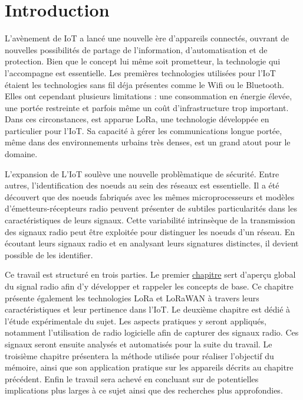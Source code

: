 

\chapter*{Introduction}

\renewcommand{\leftmark}{INTRODUCTION}

L'avènement de \ac{IoT} a lancé une nouvelle ère d'appareils connectés, ouvrant de nouvelles possibilités de partage de l'information, d'automatisation et de protection. Bien que le concept lui même soit prometteur, la technologie qui l'accompagne est essentielle.
Les premières technologies utilisées pour l'\ac{IoT} étaient les technologies sans fil déja présentes comme le Wifi ou le Bluetooth. Elles ont cependant plusieurs limitations : une consommation en énergie élevée, une portée restreinte et parfois même un coût d'infrastructure trop important.
Dans ces circonstances, est apparue \ac{LoRa}, une technologie développée en particulier pour l'\ac{IoT}. Sa capacité à gérer les communications longue portée, même dans des environnements urbains très denses, est un grand atout pour le domaine.

\vspace{0.1cm}

L'expansion de L'\ac{IoT} soulève une nouvelle problèmatique de sécurité. Entre autres, l'identification des noeuds au sein des réseaux est essentielle. Il a été dé\-couvert que des noeuds fabriqués avec les mêmes microprocesseurs et modèles d'émetteurs-récepteurs radio peuvent présenter de subtiles particularités dans les caractéristiques de leurs signaux. Cette variabilité intrinsèque de la transmission des signaux radio peut être exploitée pour distinguer les noeuds d’un réseau. En écoutant leurs signaux radio et en analysant leurs signatures distinctes, il devient possible de les identifier.

\vspace{0.1cm}

Ce travail est structuré en trois parties. Le premier          \hyperref[chap1]{chapitre} sert d'aperçu global du signal radio afin d'y développer et rappeler les concepts de base. Ce chapitre présente également les technologies \ac{LoRa} et LoRaWAN à travers leurs caractéristiques et leur pertinence dans l'\ac{IoT}.
Le deuxième chapitre est dédié à l'étude expérimentale du sujet. Les aspects pratiques y seront appliqués, notamment l'utilisation de radio logicielle afin de capturer des signaux radio. Ces signaux seront ensuite analysés et automatisés pour la suite du travail.
Le troisième chapitre présentera la méthode utilisée pour réaliser l'objectif du mémoire, ainsi que son application pratique sur les appareils décrits au chapitre précédent. Enfin le travail sera achevé en concluant sur de potentielles implications plus larges à ce sujet ainsi que des recherches plus approfondies.


